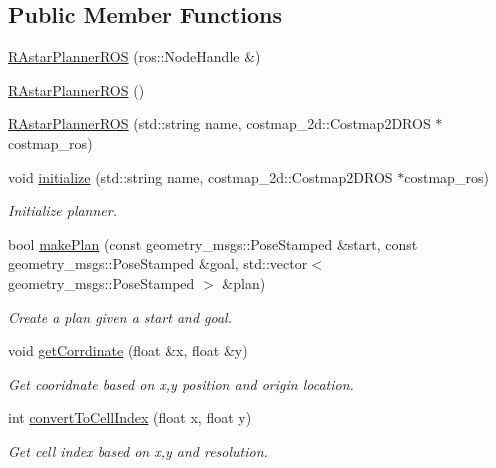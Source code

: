 \subsection*{Public Member Functions}
\begin{DoxyCompactItemize}
\item 
\hyperlink{classRAstar__planner_1_1RAstarPlannerROS_a7ab03997ec15cc3f6ad7bf9969ba8a5d}{R\-Astar\-Planner\-R\-O\-S} (ros\-::\-Node\-Handle \&)
\item 
\hyperlink{classRAstar__planner_1_1RAstarPlannerROS_a2fdd3733c0497e0ca8f5b248aec214c5}{R\-Astar\-Planner\-R\-O\-S} ()
\item 
\hyperlink{classRAstar__planner_1_1RAstarPlannerROS_abc05123045762f13f17b45d0c491034b}{R\-Astar\-Planner\-R\-O\-S} (std\-::string name, costmap\-\_\-2d\-::\-Costmap2\-D\-R\-O\-S $\ast$costmap\-\_\-ros)
\item 
void \hyperlink{classRAstar__planner_1_1RAstarPlannerROS_aed71ff1907cf853c7e49e78d3f82a94b}{initialize} (std\-::string name, costmap\-\_\-2d\-::\-Costmap2\-D\-R\-O\-S $\ast$costmap\-\_\-ros)
\begin{DoxyCompactList}\small\item\em Initialize planner. \end{DoxyCompactList}\item 
bool \hyperlink{classRAstar__planner_1_1RAstarPlannerROS_acdc8059b6324f030c47ec2322f69f658}{make\-Plan} (const geometry\-\_\-msgs\-::\-Pose\-Stamped \&start, const geometry\-\_\-msgs\-::\-Pose\-Stamped \&goal, std\-::vector$<$ geometry\-\_\-msgs\-::\-Pose\-Stamped $>$ \&plan)
\begin{DoxyCompactList}\small\item\em Create a plan given a start and goal. \end{DoxyCompactList}\item 
void \hyperlink{classRAstar__planner_1_1RAstarPlannerROS_abbc4c3daf28590f0d5e45c8227b7ff9e}{get\-Corrdinate} (float \&x, float \&y)
\begin{DoxyCompactList}\small\item\em Get cooridnate based on x,y position and origin location. \end{DoxyCompactList}\item 
int \hyperlink{classRAstar__planner_1_1RAstarPlannerROS_a50f7adc635522b9ea7f5348870b7ca6e}{convert\-To\-Cell\-Index} (float x, float y)
\begin{DoxyCompactList}\small\item\em Get cell index based on x,y and resolution. \end{DoxyCompactList}\item 

\end{DoxyCompactItemize}
